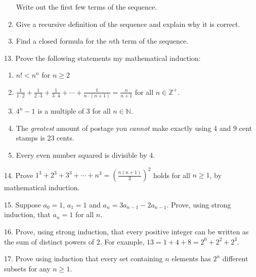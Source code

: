 \documentclass[10pt,]{book}
\theoremstyle{plain}
\theoremstyle{definition}
\theoremstyle{definition}
\theoremstyle{definition}
\numberwithin{equation}{chapter}
\def\d{\displaystyle}
\def\N{\mathbb N}
\def\Z{\mathbb Z}
\newcommand{\lt}{ < }
\begin{document}
\begin{exerciselist}
\begin{enumerate}[label=(\alph*)]
                Write out the first few terms of the sequence.
\item\hypertarget{li-998}{}
                Give a recursive definition of the sequence and explain why it is correct.
\item\hypertarget{li-999}{}
                Find a closed formula for the \(n\)th term of the sequence.
\end{enumerate}
\par\smallskip
\item[13.]\hypertarget{exercise-200}{}
            Prove the following statements my mathematical induction:
\leavevmode%
\begin{enumerate}[label=(\alph*)]
\item\hypertarget{li-1003}{}\(n! \lt  n^n\) for \(n \ge 2\)%
\item\hypertarget{li-1004}{}\(\d\frac{1}{1\cdot 2} + \frac{1}{2\cdot 3} +\frac{1}{3\cdot 4}+\cdots + \frac{1}{n\cdot(n+1)} = \d\frac{n}{n+1}\) for all \(n \in \Z^+\).%
\item\hypertarget{li-1005}{}\(4^n - 1\) is a multiple of 3 for all \(n \in \N\).%
\item\hypertarget{li-1006}{}
                The \emph{greatest} amount of postage you \emph{cannot} make exactly using 4 and 9 cent stamps is 23 cents.
\item\hypertarget{li-1007}{}
                Every even number squared is divisible by 4.
\end{enumerate}
\par\smallskip
\item[14.]\hypertarget{exercise-201}{}
            Prove \(1^3 + 2^3 + 3^3 + \cdots + n^3 = \left(\frac{n(n+1)}{2}\right)^2\) holds for all \(n \ge 1\), by mathematical induction.
\par\smallskip
\item[15.]\hypertarget{exercise-202}{}
            Suppose \(a_0 = 1\), \(a_1 = 1\) and \(a_n = 3a_{n-1} - 2a_{n-1}\). Prove, using strong induction, that \(a_n = 1\) for all \(n\).
\par\smallskip
\item[16.]\hypertarget{exercise-203}{}
            Prove, using strong induction, that every positive integer can be written as the sum of distinct powers of 2. For example, \(13 = 1 + 4 + 8 = 2^0 + 2^2 + 2^3\).
\par\smallskip
\item[17.]\hypertarget{exercise-204}{}
            Prove using induction that every set containing \(n\) elements has \(2^n\) different subsets for any \(n \ge 1\).
\par\smallskip
\end{exerciselist}
\typeout{************************************************}
\typeout{************************************************}
\end{document}
